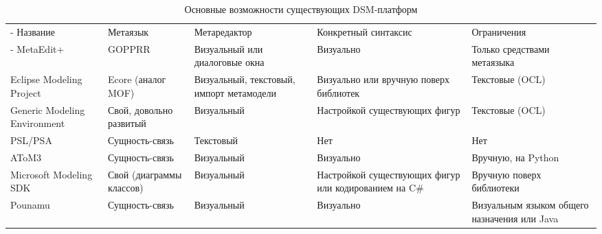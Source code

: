 
\begin{table}[ht]
\begin{small}
	\begin{longtabu} {| X[1 l p] | X[1 l p] | X[1 l p] | X[1 l p] |X[1 l p] |}
		\caption{Основные возможности существующих DSM-платформ} \\
		\tabucline-
		 Название                    & Метаязык                        & Метаредактор                                            & Конкретный синтаксис                                     & Ограничения                                    \\
		\tabucline-
		\everyrow{\tabucline-}
		MetaEdit+                    & GOPPRR                          & Визуальный или диалоговые окна                          & Визуально                                                & Только средствами метаязыка                    \\
		Eclipse Modeling Project     & Ecore (аналог MOF)              & Визуальный, текстовый, импорт метамодели                & Визуально или вручную поверх библиотек                   & Текстовые (OCL)                                \\
		Generic Modeling Environment & Свой, довольно развитый         & Визуальный                                              & Настройкой существующих фигур                            & Текстовые (OCL)                                \\
		PSL/PSA                      & Сущность-связь                  & Текстовый                                               & Нет                                                      & Нет                                            \\
		AToM3                        & Сущность-связь                  & Визуальный                                              & Визуально                                                & Вручную, на Python                             \\
		Microsoft Modeling SDK       & Свой (диаграммы классов)        & Визуальный                                              & Настройкой существующих фигур или кодированием на C\#    & Вручную поверх библиотеки                      \\
		Pounamu                      & Сущность-связь                  & Визуальный                                              & Визуально                                                & Визуальным языком общего назначения или Java   \\

\end{longtabu}
\end{small}
\end{table}
